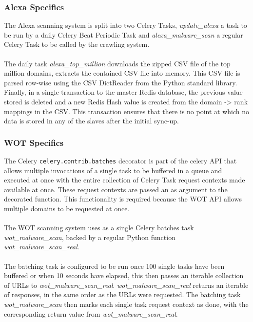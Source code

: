 \subsubsection{Alexa Specifics}
The Alexa scanning system is split into two Celery Tasks, \emph{update\_alexa} a task to be run by a daily Celery Beat Periodic Task and \emph{alexa\_malware\_scan} a regular Celery Task to be called by the crawling system.

\paragraph{}
The daily task \emph{alexa\_top\_million} downloads the zipped CSV file of the top million domains, extracts the contained CSV file into memory. This CSV file is parsed row-wise using the CSV DictReader from the Python standard library. Finally, in a single transaction to the master Redis database, the previous value stored is deleted and a new Redis Hash value is created from the domain -> rank mappings in the CSV. This transaction ensures that there is no point at which no data is stored in any of the slaves after the initial sync-up.

\subsubsection{WOT Specifics}
The Celery \verb`celery.contrib.batches` decorator is part of the celery API that allows multiple invocations of a single task to be buffered in a queue and executed at once with the entire collection of Celery Task request contexts made available at once. These request contexts are passed an as argument to the decorated function. This functionality is required because the WOT API allows multiple domains to be requested at once.

\paragraph{}
The WOT scanning system uses as a single Celery batches task \emph{wot\_malware\_scan}, backed by a regular Python function \emph{wot\_malware\_scan\_real}.

\paragraph{}
The batching task is configured to be run once 100 single tasks have been buffered or when 10 seconds have elapsed, this then passes an iterable collection of URLs to \emph{wot\_malware\_scan\_real}. \emph{wot\_malware\_scan\_real} returns an iterable of responses, in the same order as the URLs were requested. The batching task \emph{wot\_malware\_scan} then marks each single task request context as done, with the corresponding return value from \emph{wot\_malware\_scan\_real}\cite{celery-batches}.

